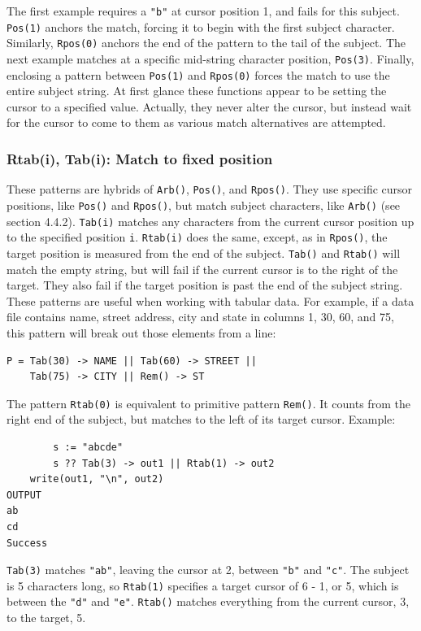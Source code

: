 \documentclass[letterpaper,12pt]{article}
\begin{document}
The first example requires a {\tt "b"} at cursor position 1, and fails for
this subject. {\tt Pos(1)} anchors the match, forcing it to begin with the
first subject character. Similarly, {\tt Rpos(0)} anchors the end of the
pattern to the tail of the subject. The next example matches at a
specific mid-string character position, {\tt Pos(3)}. Finally, enclosing a
pattern between {\tt Pos(1)} and {\tt Rpos(0)} forces the match to use the
entire subject string.  At first glance these functions appear to be
setting the cursor to a specified value. Actually, they never alter
the cursor, but instead wait for the cursor to come to them as various
match alternatives are attempted.

\subsubsection{Rtab(i), Tab(i): Match to fixed position}

These patterns are hybrids of {\tt Arb()}, {\tt Pos()}, and {\tt Rpos()}.
They use specific cursor positions, like {\tt Pos()} and {\tt Rpos()},
but match subject characters, like {\tt Arb()} (see section 4.4.2).
{\tt Tab(i)} matches any characters from the
current cursor position up to the specified position {\tt i}. {\tt Rtab(i)}
does the same, except, as in {\tt Rpos()}, the target position is measured
from the end of the subject.  {\tt Tab()} and {\tt Rtab()} will match the
empty string, but
will fail if the current cursor is to the right of the target. They
also fail if the target position is past the end of the subject
string.  These patterns are useful when working with tabular data. For
example, if a data file contains name, street address, city and state
in columns 1, 30, 60, and 75, this pattern will break out those
elements from a line:

\begin{verbatim}
P = Tab(30) -> NAME || Tab(60) -> STREET || 
	Tab(75) -> CITY || Rem() -> ST
\end{verbatim}

The pattern {\tt Rtab(0)} is equivalent to primitive pattern {\tt Rem()}.
It counts from the right end of the subject, but matches to the left of
its target cursor. Example:

\begin{verbatim}
        s := "abcde"
        s ?? Tab(3) -> out1 || Rtab(1) -> out2
	write(out1, "\n", out2)
OUTPUT
ab
cd
Success
\end{verbatim}


{\tt Tab(3)} matches \texttt{"ab"}, leaving the cursor at 2, between
\texttt{"b"} and \texttt{"c"}. The subject is 5 characters long, so
{\tt Rtab(1)} specifies a target cursor of 6 - 1, or 5, which is between
the {\tt "d"} and {\tt "e"}.
{\tt Rtab()} matches everything from the current cursor,
3, to the target, 5.
\end{document}
